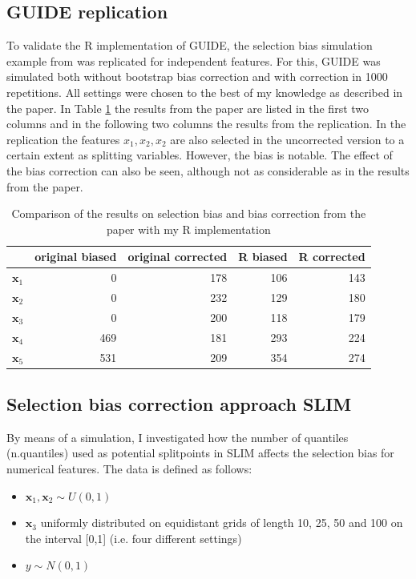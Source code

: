 \subsection{GUIDE replication}
To validate the R implementation of GUIDE, the selection bias simulation example from \citep{Loh.2002} was replicated for independent features. For this, GUIDE was simulated both without bootstrap bias correction and with correction in 1000 repetitions. All settings were chosen to the best of my knowledge as described in the paper. In Table \ref{tab:app_guide_selection_bias} the results from the paper are listed in the first two columns and in the following two columns the results from the replication. In the replication the features $x_1, x_2, x_2$ are also selected in the uncorrected version to a certain extent as splitting variables. However, the bias is notable. The effect of the bias correction can also be seen, although not as considerable as in the results from the paper. 

\begin{table}[!htb]
\centering
\begin{tabular}[t]{l|rr|rr}
\hline
  & original biased & original corrected & R biased & R corrected\\
\hline
$\textbf{x}_1$ & 0 & 178 & 106 & 143\\
$\textbf{x}_2$ & 0 & 232 & 129 & 180\\
$\textbf{x}_3$ & 0 & 200 & 118 & 179\\
$\textbf{x}_4$ & 469 & 181 & 293 & 224\\
$\textbf{x}_5$ & 531 & 209 & 354 & 274\\
\hline
\end{tabular}
\caption{Comparison of the results on selection bias and bias correction from the paper \citep{Loh.2002} with my R implementation}
\label{tab:app_guide_selection_bias}
\end{table}

\subsection{Selection bias correction approach SLIM} \label{app:selection_bias_correction}

By means of a simulation, I investigated how the number of quantiles (n.quantiles) used as potential splitpoints in SLIM affects the selection bias for numerical features. 
The data is defined as follows:
\begin{itemize}
    \item $\textbf{x}_1, \textbf{x}_2 \sim U(0,1)$
    \item $\textbf{x}_3$ uniformly distributed on equidistant grids of length 10, 25, 50 and 100 on the interval [0,1] (i.e. four different settings)
    \item $y \sim N(0,1)$
\end{itemize}

